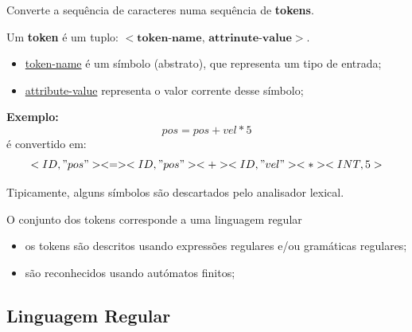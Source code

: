 \documentclass{article}
\begin{document}
\begin{flushleft}
  \item Converte a sequência de caracteres numa sequência de \textbf{tokens}.
  \item Um \textbf{token} é um tuplo: $\textbf{$<$token-name, attrinute-value$>$}$.
  \begin{itemize}
    \item \uline{token-name} é um símbolo (abstrato), que representa um tipo de entrada;
    \item \uline{attribute-value} representa o valor corrente desse símbolo;
  \end{itemize}
  \item \textbf{Exemplo:}
  \[pos = pos + vel * 5\]
  é convertido em:
  \[<ID,"pos"> <=> <ID,"pos"> <+> <ID,"vel">
  <*> <INT,5>\]

  \item Tipicamente, alguns símbolos são descartados pelo analisador lexical.
  \item O conjunto dos tokens corresponde a uma linguagem regular
  \begin{itemize}
    \item os tokens são descritos usando expressões regulares e/ou gramáticas regulares;
    \item são reconhecidos usando autómatos finitos;
  \end{itemize}
\end{flushleft}

\pagebreak

\subsection{Linguagem Regular}
\end{document}
